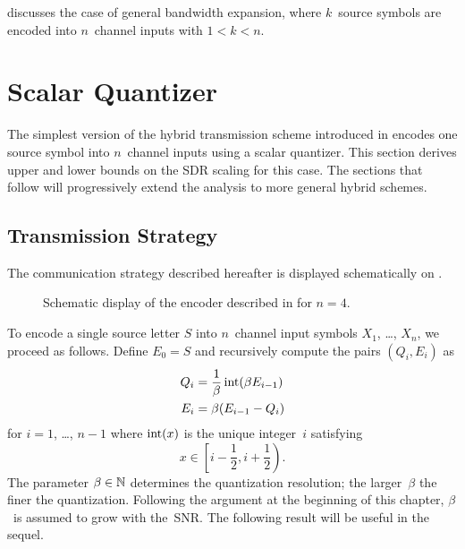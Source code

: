  discusses the case of general bandwidth expansion, where
$k$~source symbols are encoded into $n$~channel inputs with $1 < k < n$. 








\section{Scalar Quantizer}\label{sec:scalarquant}

The simplest version of the hybrid transmission scheme introduced in
 encodes one source symbol into $n$~channel inputs using a
scalar quantizer. This section derives upper and lower bounds on the SDR
scaling for this case. The sections that follow will progressively extend the
analysis to more general hybrid schemes.


\subsection{Transmission Strategy}\label{sec:commscheme}

The communication strategy described hereafter is displayed schematically on
.
\begin{figure}[tbp]
  \begin{center}
    
  \end{center}
  \caption{Schematic display of the encoder described in  for
  $n = 4$.}
  \label{fig:1nencoding}
\end{figure}
To encode a single source letter $S$ into $n$~channel input symbols $X_1$,
\dots, $X_n$, we proceed as follows. Define $E_0 = S$ and recursively compute
the pairs $(Q_i, E_i)$ as
\begin{align}
  Q_i &= \frac{1}{\beta}\operatorname{int}(\beta E_{i-1}) \nonumber \\
  E_i &= \beta (E_{i-1} - Q_i) \label{eq:QEdef}
\end{align}
for $i = 1$, \dots, $n-1$ where $\operatorname{int}(x)$ is the unique integer~$i$ satisfying
\begin{equation*}
  x \in \left[i - \frac12, i +\frac12\right).
\end{equation*}
The parameter $\beta \in
{\mathbb{N}}$ determines the quantization resolution; the larger~$\beta$ the finer the
quantization. Following the argument at the beginning of this chapter,
$\beta$~is assumed to grow with the~SNR. The following result will be useful in
the sequel.

